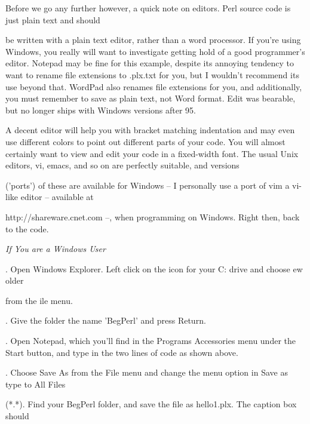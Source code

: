 \documentclass[a4paper,11pt]{book}
\begin{document}
\noindent 

\noindent Before we go any further however, a quick note on editors. Perl source code is just plain text and should

\noindent be written with a plain text editor, rather than a word processor. If you're using Windows, you really will want to investigate getting hold of a good programmer's editor. Notepad may be fine for this example, despite its annoying tendency to want to rename file extensions to .plx.txt for you, but I wouldn't recommend its use beyond that. WordPad also renames file extensions for you, and additionally, you must remember to save as plain text, not Word format. Edit was bearable, but no longer ships with Windows versions after 95.

\noindent 

\noindent A decent editor will help you with bracket matching indentation and may even use different colors to point out different parts of your code. You will almost certainly want to view and edit your code in a fixed-width font. The usual Unix editors, vi, emacs, and so on are perfectly suitable, and versions

\noindent ('ports') of these are available for Windows -- I personally use a port of vim a vi-like editor -- available at

\noindent http://shareware.cnet.com --, when programming on Windows. Right then, back to the code.

\noindent \textit{If You are a Windows User}

.   Open Windows Explorer. Left click on the icon for your C: drive and choose ew \textbar  {}older

\noindent from the ile menu.

\noindent 

.   Give the folder the name 'BegPerl' and press Return.

\noindent 

.   Open Notepad, which you'll find in the Programs \textbar  Accessories menu under the Start button, and type in the two lines of code as shown above.

\noindent 

.   Choose Save As from the File menu and change the menu option in Save as type to All Files

\noindent (*.*). Find your BegPerl folder, and save the file as hello1.plx. The caption box should
\end{document}
